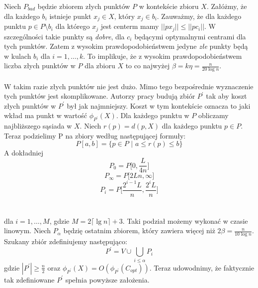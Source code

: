 \noindent
Niech $P_{bad}$ będzie zbiorem złych punktów $P$ w kontekście zbioru $X$.
Załóżmy, że dla każdego $b_{i}$ istnieje punkt $x_{j} \in X$, który $x_{j} \in b_{i}$.
Zauważmy, że dla każdego punktu $p \in P \setminus b_{i}$ dla którego $x_{j}$ jest centerm mamy $||px_{j}|| \leq ||pc_{i}||$.
W szczególności takie punkty są \textit{dobre}, dla $c_{i}$ będącymi optymalnymi centrami dla tych punktów.
Zatem z wysokim prawdopodobieństwem jedyne \textit{złe} punkty będą w kulach $b_{i}$ dla $ i = 1, \dots, k$.
To implikuje, że z wysokim prawdopodobieństwem liczba złych punktów w $P$ dla zbioru $X$ to co najwyżej $\beta = k\eta = \frac{n}{20 \log n}$.
\\~\\
W takim razie złych punktów nie jest dużo.
Mimo tego bezpośrednie wyznaczenie tych punktów jest skomplikowane.
Autorzy pracy \cite{10.1145/1007352.1007400} budują zbiór $P^{'}$ tak aby koszt złych punktów w $P^{'}$ był jak najmniejszy.
Koszt w tym kontekście oznacza to jaki wkład ma punkt w wartość $\phi_{P^{'}}(X)$.
Dla każdego punktu w $P$ obliczamy najbliższego sąsiada w $X$.
Niech $r(p) = d(p, X)$ dla każdego punktu $p \in P$.
Teraz podzielimy P na zbiory według następującej formuły:
\begin{equation}
    P[a,b] = \{ p \in P \text{ | } a \leq r(p) \leq b \}
\end{equation}
A dokładniej
\begin{equation}
    P_{0} = P\Big[0, \frac{L}{4n}\Big]
\end{equation}
\begin{equation}
    P_{ \infty } = P\Big[2Ln, \infty \Big]
\end{equation}
\begin{equation}
    P_{i} = P\Big[ \frac{2^{i-1}L}{n}, \frac{2^{i}L}{n} \Big]
\end{equation}
\\~\\
dla $i = 1, \dots, M$, gdzie $M = 2 \lceil \lg n \rceil + 3$.
Taki podział możemy wykonać w czasie linowym.
Niech $P_{\alpha}$ będzię ostatnim zbiorem, który zawiera więcej niż $2\beta = \frac{n}{10 \log n}$. 
Szukany zbiór zdefiniujemy następująco:
\begin{equation}
    P^{'} = V \cup \bigcup_{i \leq \alpha} P_{i}
\end{equation}
gdzie $|P^{'}| \geq \frac{n}{2}$ oraz $\phi_{P^{'}}(X) = O(\phi_{P^{'}}(C_{opt}))$.
Teraz udowodnimy, że faktycznie tak zdefiniowane $P^{'}$ spełnia powyższe założenia.

